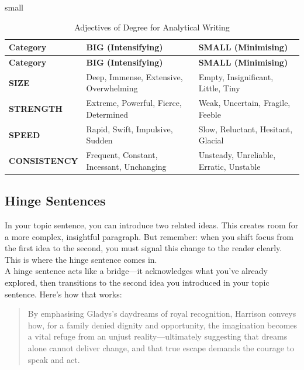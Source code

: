 \documentclass[a4paper]{article}
\begin{document}
{small
\begin{longtable}{|p{2.5cm}|p{3cm}|p{3cm}|}
\caption{Adjectives of Degree for Analytical Writing} \label{tab:adjectivesdegree} \\
\hline
\textbf{Category} & \textbf{BIG (Intensifying)} & \textbf{SMALL (Minimising)} \\
\hline
\endfirsthead

\hline
\textbf{Category} & \textbf{BIG (Intensifying)} & \textbf{SMALL (Minimising)} \\
\hline
\endhead

\hline
\endfoot

\textbf{SIZE}         & Deep, Immense, Extensive, Overwhelming         & Empty, Insignificant, Little, Tiny \\
\textbf{STRENGTH}     & Extreme, Powerful, Fierce, Determined           & Weak, Uncertain, Fragile, Feeble \\
\textbf{SPEED}        & Rapid, Swift, Impulsive, Sudden                 & Slow, Reluctant, Hesitant, Glacial \\
\textbf{CONSISTENCY}  & Frequent, Constant, Incessant, Unchanging       & Unsteady, Unreliable, Erratic, Unstable \\
\hline

\end{longtable}

}

\subsection{Hinge Sentences}
In your topic sentence, you can introduce two related ideas. This creates room for a more complex, insightful paragraph. But remember: when you shift focus from the first idea to the second, you must signal this change to the reader clearly. This is where the hinge sentence comes in.\\

A hinge sentence acts like a bridge—it acknowledges what you've already explored, then transitions to the second idea you introduced in your topic sentence. Here’s how that works:
\begin{quote}
    By emphasising Gladys’s daydreams of royal recognition, Harrison conveys how, for a family denied dignity and opportunity, the imagination becomes a vital refuge from an unjust reality—ultimately suggesting that dreams alone cannot deliver change, and that true escape demands the courage to speak and act.
\end{quote}
\end{document}
